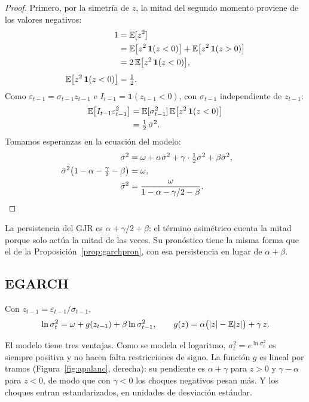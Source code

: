 \begin{proof}
Primero, por la simetría de $z$, la mitad del segundo momento proviene de los valores negativos:
\begin{align*}
  1 &= \mathbb{E}[z^2]\\
    &= \mathbb{E}\bigl[z^2\,\mathbf 1(z<0)\bigr]+\mathbb{E}\bigl[z^2\,\mathbf 1(z>0)\bigr]\\
    &= 2\,\mathbb{E}\bigl[z^2\,\mathbf 1(z<0)\bigr],\\[4pt]
  \mathbb{E}\bigl[z^2\,\mathbf 1(z<0)\bigr] &= \tfrac12 .
\end{align*}
Como $\varepsilon_{t-1}=\sigma_{t-1}z_{t-1}$ e $I_{t-1}=\mathbf 1(z_{t-1}<0)$, con $\sigma_{t-1}$ independiente de
$z_{t-1}$:
\begin{align*}
  \mathbb{E}\bigl[I_{t-1}\varepsilon_{t-1}^2\bigr] &= \mathbb{E}[\sigma_{t-1}^2]\,\mathbb{E}\bigl[z^2\,\mathbf 1(z<0)\bigr]\\
                                          &= \tfrac12\,\bar\sigma^2 .
\end{align*}
Tomamos esperanzas en la ecuación del modelo:
\begin{align*}
  \bar\sigma^2 &= \omega+\alpha\bar\sigma^2+\gamma\cdot\tfrac12\bar\sigma^2+\beta\bar\sigma^2,\\
  \bar\sigma^2\bigl(1-\alpha-\tfrac\gamma2-\beta\bigr) &= \omega,\\
  \bar\sigma^2 &= \frac{\omega}{1-\alpha-\gamma/2-\beta}. && \qedhere
\end{align*}
\end{proof}

La persistencia del GJR es $\alpha+\gamma/2+\beta$: el término asimétrico cuenta la mitad porque solo actúa la
mitad de las veces. Su pronóstico tiene la misma forma que el de la Proposición~\ref{prop:garchpron}, con esa
persistencia en lugar de $\alpha+\beta$.

\subsection{EGARCH}

\begin{definicion}
Con $z_{t-1}=\varepsilon_{t-1}/\sigma_{t-1}$,
\[
  \ln\sigma_t^2=\omega+g(z_{t-1})+\beta\ln\sigma_{t-1}^2,\qquad
  g(z)=\alpha\bigl(|z|-\mathbb{E}|z|\bigr)+\gamma\,z .
\]
\end{definicion}

El modelo tiene tres ventajas. Como se modela el logaritmo, $\sigma_t^2=e^{\ln\sigma_t^2}$ es siempre positiva
y no hacen falta restricciones de signo. La función $g$ es lineal por tramos (Figura~\ref{fig:apalanc},
derecha): su pendiente es $\alpha+\gamma$ para $z>0$ y $\gamma-\alpha$ para $z<0$, de modo que con $\gamma<0$ los
choques negativos pesan más. Y los choques entran estandarizados, en unidades de desviación estándar.

